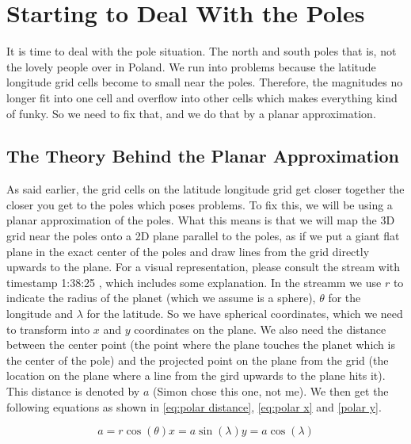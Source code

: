 \section{Starting to Deal With the Poles}
It is time to deal with the pole situation. The north and south poles that is, not the lovely people over in Poland. We run into problems because the latitude longitude grid cells become to small 
near the poles. Therefore, the magnitudes no longer fit into one cell and overflow into other cells which makes everything kind of funky. So we need to fix that, and we do that by a planar 
approximation. 

\subsection{The Theory Behind the Planar Approximation}
As said earlier, the grid cells on the latitude longitude grid get closer together the closer you get to the poles which poses problems. To fix this, we will be using a planar approximation of 
the poles. What this means is that we will map the 3D grid near the poles onto a 2D plane parallel to the poles, as if we put a giant flat plane in the exact center of the poles and draw lines
from the grid directly upwards to the plane. For a visual representation, please consult the stream with timestamp 1:38:25 \cite{polarPlane}, which includes some explanation. In the streamm we
use $r$ to indicate the radius of the planet (which we assume is a sphere), $\theta$ for the longitude and $\lambda$ for the latitude. So we have spherical coordinates, which we need to transform
into $x$ and $y$ coordinates on the plane. We also need the distance between the center point (the point where the plane touches the planet which is the center of the pole) and the projected 
point on the plane from the grid (the location on the plane where a line from the gird upwards to the plane hits it). This distance is denoted by $a$ (Simon chose this one, not me). We then get 
the following equations as shown in \autoref{eq:polar distance}, \autoref{eq:polar x} and \autoref{polar y}. 

\begin{subequations}
    \begin{equation}
        a = r \cos(\theta)
        \label{eq:polar distance}
    \end{equation}
    \begin{equation}
        x = a \sin(\lambda)
        \label{eq:polar x}
    \end{equation}
    \begin{equation}
        y = a \cos(\lambda)
        \label{eq:polar y}
    \end{equation}
\end{subequations}

